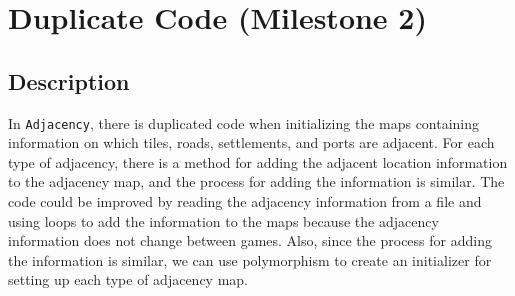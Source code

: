 \documentclass{fank1basedocument}
\begin{document}
\tableofcontents

\section*{Duplicate Code (Milestone 2)}
\subsection*{Description}
In \texttt{Adjacency}, there is duplicated code when initializing the maps containing information on which tiles, roads, settlements, and ports are adjacent. For each type of adjacency, there is a method for adding the adjacent location information to the adjacency map, and the process for adding the information is similar. The code could be improved by reading the adjacency information from a ﬁle and using loops to add the information to the maps because the adjacency information does not change between games. Also, since the process for adding the information is similar, we can use polymorphism to create an initializer for setting up each type of adjacency map.
\end{document}
